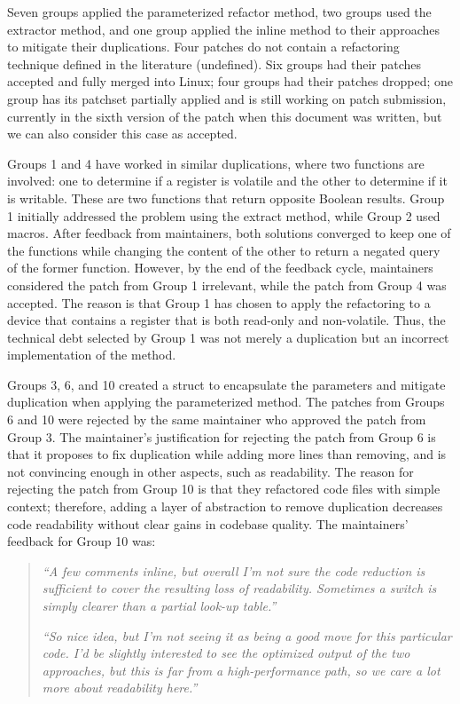 \documentclass[10pt,conference]{IEEEtran}
\begin{document}
Seven groups applied the parameterized refactor method, two groups used the extractor method, and one group applied the inline method to their approaches to mitigate their duplications. Four patches do not contain a refactoring technique defined in the literature (undefined). Six groups had their patches accepted and fully merged into Linux; four groups had their patches dropped; one group has its patchset partially applied and is still working on patch submission, currently in the sixth version of the patch when this document was written, but we can also consider this case as accepted.

Groups 1 and 4 have worked in similar duplications, where two functions are involved: one to determine if a register is volatile and the other to determine if it is writable. These are two functions that return opposite Boolean results. Group 1 initially addressed the problem using the extract method, while Group 2 used macros. After feedback from maintainers, both solutions converged to keep one of the functions while changing the content of the other to return a negated query of the former function. However, by the end of the feedback cycle, maintainers considered the patch from Group 1 irrelevant, while the patch from Group 4 was accepted. The reason is that Group 1 has chosen to apply the refactoring to a device that contains a register that is both read-only and non-volatile. Thus, the technical debt selected by Group 1 was not merely a duplication but an incorrect implementation of the method.

Groups 3, 6, and 10 created a struct to encapsulate the parameters and mitigate duplication when applying the parameterized method. The patches from Groups 6 and 10 were rejected by the same maintainer who approved the patch from Group 3. The maintainer's justification for rejecting the patch from Group 6 is that it proposes to fix duplication while adding more lines than removing, and is not convincing enough in other aspects, such as readability. The reason for rejecting the patch from Group 10 is that they refactored code files with simple context; therefore, adding a layer of abstraction to remove duplication decreases code readability without clear gains in codebase quality. The maintainers' feedback for Group 10 was:
\begin{quote}

\textit{``A few comments inline, but overall I'm not sure the code reduction is sufficient to cover the resulting loss of readability. Sometimes a switch is simply clearer than a partial look-up table.''}

\textit{``So nice idea, but I'm not seeing it as being a good move for this particular code. I'd be slightly interested to see the optimized output of the two approaches, but this is far from a high-performance path, so we care a lot more about readability here.''} 
\end{quote}
\end{document}

